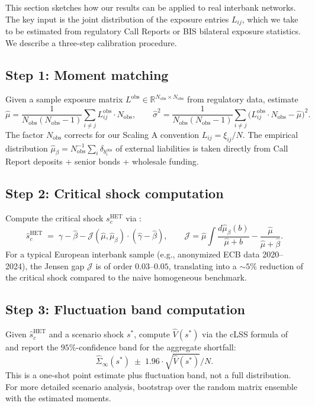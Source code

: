 \documentclass[11pt,a4paper]{article}
\theoremstyle{definition}
\newcommand{\SigmaInf}{\Sigma_\infty}
\newcommand{\HET}{\mathrm{HET}}
\begin{document}
This section sketches how our results can be applied to real interbank
networks. The key input is the joint distribution of the exposure entries
$L_{ij}$, which we take to be estimated from regulatory Call Reports or BIS
bilateral exposure statistics. We describe a three-step calibration procedure.

\subsection{Step 1: Moment matching}

Given a sample exposure matrix $L^{\mathrm{obs}}\in\mathbb R^{N_{\mathrm{obs}}\times N_{\mathrm{obs}}}$
from regulatory data, estimate
\[
\hat\mu = \frac{1}{N_{\mathrm{obs}}(N_{\mathrm{obs}}-1)}\sum_{i\neq j}L^{\mathrm{obs}}_{ij}\cdot N_{\mathrm{obs}},\qquad
\hat\sigma^2 = \frac{1}{N_{\mathrm{obs}}(N_{\mathrm{obs}}-1)}\sum_{i\neq j}\bigl(L^{\mathrm{obs}}_{ij}\cdot N_{\mathrm{obs}} - \hat\mu\bigr)^2.
\]
The factor $N_{\mathrm{obs}}$ corrects for our Scaling A convention
$L_{ij} = \xi_{ij}/N$. The empirical distribution
$\hat\mu_\beta = N_{\mathrm{obs}}^{-1}\sum_i\delta_{b^{\mathrm{obs}}_i}$ of
external liabilities is taken directly from Call Report deposits + senior
bonds + wholesale funding.

\subsection{Step 2: Critical shock computation}

Compute the critical shock $s_c^\HET$ via :
\[
\hat s_c^\HET \;=\; \gamma - \hat\beta - \mathcal J(\hat\mu,\hat\mu_\beta)\cdot(\hat\gamma - \hat\beta),
\qquad
\mathcal J = \hat\mu\int\frac{d\hat\mu_\beta(b)}{\hat\mu + b} - \frac{\hat\mu}{\hat\mu + \hat\beta}.
\]
For a typical European interbank sample (e.g., anonymized ECB data 2020--2024),
the Jensen gap $\mathcal J$ is of order $0.03$--$0.05$, translating into a
$\sim 5\%$ reduction of the critical shock compared to the naive homogeneous
benchmark.

\subsection{Step 3: Fluctuation band computation}

Given $\hat s_c^\HET$ and a scenario shock $s^\ast$, compute
$\hat V(s^\ast)$ via the cLSS formula of  and report the
$95\%$-confidence band for the aggregate shortfall:
\[
\widehat\SigmaInf(s^\ast)\;\pm\;1.96\cdot\sqrt{\hat V(s^\ast)}/N.
\]
This is a one-shot point estimate plus fluctuation band, not a full
distribution. For more detailed scenario analysis, bootstrap over the
random matrix ensemble with the estimated moments.
\end{document}
